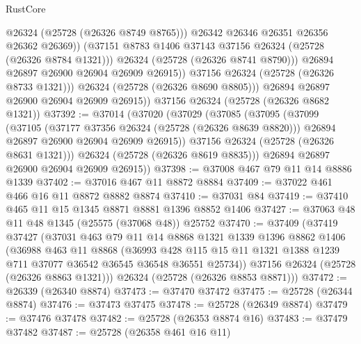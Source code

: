 \begin{lexlean}{RustCore}
\begin{coremodule}
                        @26324
                        (@25728 (@26326 @8749 @8765)))
                      @26342
                      @26346
                      @26351
                      @26356
                      @26362
                      @26369))
                  (@37151 @8783 @1406 @37143 @37156 @26324 (@25728 (@26326 @8784 @1321)))
                  @26324
                  (@25728 (@26326 @8741 @8790)))
                @26894
                @26897
                @26900
                @26904
                @26909
                @26915))
            @37156
            @26324
            (@25728 (@26326 @8733 @1321)))
          @26324
          (@25728 (@26326 @8690 @8805)))
        @26894
        @26897
        @26900
        @26904
        @26909
        @26915))
    @37156
    @26324
    (@25728 (@26326 @8682 @1321))
@37392 := @37014
    (@37020
      (@37029
        (@37085
          (@37095
            (@37099
              (@37105
                (@37177 @37356 @26324 (@25728 (@26326 @8639 @8820)))
                @26894
                @26897
                @26900
                @26904
                @26909
                @26915))
            @37156
            @26324
            (@25728 (@26326 @8631 @1321)))
          @26324
          (@25728 (@26326 @8619 @8835)))
        @26894
        @26897
        @26900
        @26904
        @26909
        @26915))
@37398 := @37008 @467 @79 @11 @14 @8886 @1339
@37402 := @37016 @467 @11 @8872 @8884
@37409 := @37022 @461 @466 @16 @11 @8872 @8882 @8874
@37410 := @37031 @84
@37419 := @37410 @465 @11 @15 @1345 @8871 @8881 @1396 @8852 @1406
@37427 := @37063 @48 @11 @48 @1345 (@25575 (@37068 @48)) @25752
@37470 := @37409
    (@37419
      @37427
      (@37031
        @463
        @79
        @11
        @14
        @8868
        @1321
        @1339
        @1396
        @8862
        @1406
        (@36988
          @463
          @11
          @8868
          (@36993
            @428
            @115
            @15
            @11
            @1321
            @1388
            @1239
            @711
            @37077
            @36542
            @36545
            @36548
            @36551
            @25734))
        @37156
        @26324
        (@25728 (@26326 @8863 @1321)))
      @26324
      (@25728 (@26326 @8853 @8871)))
@37472 := @26339 (@26340 @8874)
@37473 := @37470 @37472
@37475 := @25728 (@26344 @8874)
@37476 := @37473 @37475
@37478 := @25728 (@26349 @8874)
@37479 := @37476 @37478
@37482 := @25728 (@26353 @8874 @16)
@37483 := @37479 @37482
@37487 := @25728 (@26358 @461 @16 @11)

\end{coremodule}
\end{lexlean}
